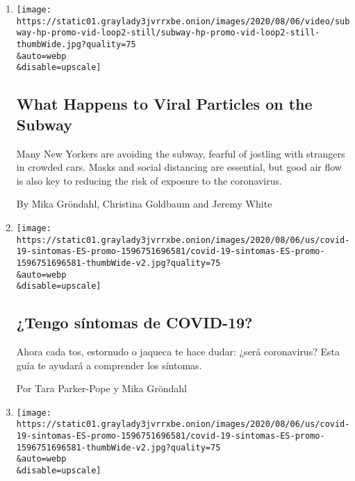 \begin{enumerate}
\def\labelenumi{\arabic{enumi}.}
\item
  \href{/interactive/2020/08/10/nyregion/nyc-subway-coronavirus.html}{}

  \texttt{[image: https://static01.graylady3jvrrxbe.onion/images/2020/08/06/video/subway-hp-promo-vid-loop2-still/subway-hp-promo-vid-loop2-still-thumbWide.jpg?quality=75\\\&auto=webp\\\&disable=upscale]}

  \hypertarget{what-happens-to-viral-particles-on-the-subway}{%
  \subsection{What Happens to Viral Particles on the
  Subway}\label{what-happens-to-viral-particles-on-the-subway}}

  Many New Yorkers are avoiding the subway, fearful of jostling with
  strangers in crowded cars. Masks and social distancing are essential,
  but good air flow is also key to reducing the risk of exposure to the
  coronavirus.

  By Mika Gröndahl, Christina Goldbaum and Jeremy White
\item
  \href{/es/interactive/2020/08/06/espanol/ciencia-y-tecnologia/tengo-covid-19-sintomas.html}{}

  \texttt{[image: https://static01.graylady3jvrrxbe.onion/images/2020/08/06/us/covid-19-sintomas-ES-promo-1596751696581/covid-19-sintomas-ES-promo-1596751696581-thumbWide-v2.jpg?quality=75\\\&auto=webp\\\&disable=upscale]}

  \hypertarget{tengo-suxedntomas-de-covid-19}{%
  \subsection{¿Tengo síntomas de
  COVID-19?}\label{tengo-suxedntomas-de-covid-19}}

  Ahora cada tos, estornudo o jaqueca te hace dudar: ¿será coronavirus?
  Esta guía te ayudará a comprender los síntomas.

  Por Tara Parker-Pope y Mika Gröndahl
\item
  \href{/es/interactive/2020/08/06/espanol/ciencia-y-tecnologia/tengo-covid-19-sintomas.html}{}

  \texttt{[image: https://static01.graylady3jvrrxbe.onion/images/2020/08/06/us/covid-19-sintomas-ES-promo-1596751696581/covid-19-sintomas-ES-promo-1596751696581-thumbWide-v2.jpg?quality=75\\\&auto=webp\\\&disable=upscale]}


\end{enumerate}

